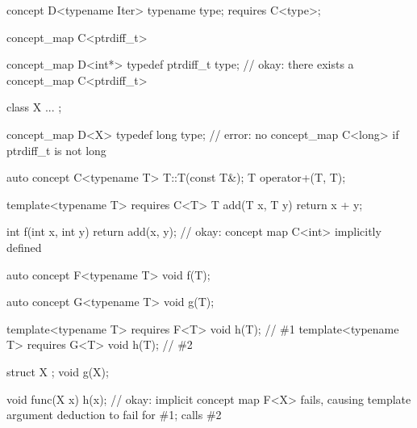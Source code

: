 \documentclass[american]{book}
\begin{document}
\begin{paras}
\begin{codeblock}
concept D<typename Iter> {
  typename type;
  requires C<type>;
}

concept_map C<ptrdiff_t> { }

concept_map D<int*> {
  typedef ptrdiff_t type;
} // okay: there exists a concept_map C<ptrdiff_t>

class X { ... };

concept_map D<X> {
  typedef long type;
} // error: no concept_map C<long> if ptrdiff_t is not long
\end{codeblock} 
\addedConcepts{\mbox{\exitexample}}

\pnum
{}
\addedCC{(\mbox{\ref{concept.def}})}
 
\begin{codeblock}
auto concept C<typename T> {
  T::T(const T&);
  T operator+(T, T);
}

template<typename T>
requires C<T>
T add(T x, T y) {
  return x + y;
}

int f(int x, int y) {
  return add(x, y); // okay: concept map C<int> implicitly defined
}
\end{codeblock}
\addedConcepts{\mbox{\exitexample}}

\pnum
{}
\begin{codeblock}
auto concept F<typename T> {
  void f(T);
}

auto concept G<typename T> {
  void g(T);
}

template<typename T> requires F<T> void h(T); // \#1
template<typename T> requires G<T> void h(T); // \#2

struct X { };
void g(X);

void func(X x) {
  h(x); // okay: implicit concept map F<X> fails, causing template argument deduction to fail for \#1; calls \#2
}
\end{codeblock}
\addedConcepts{\mbox{\exitexample}}


\end{paras}
\end{document}
